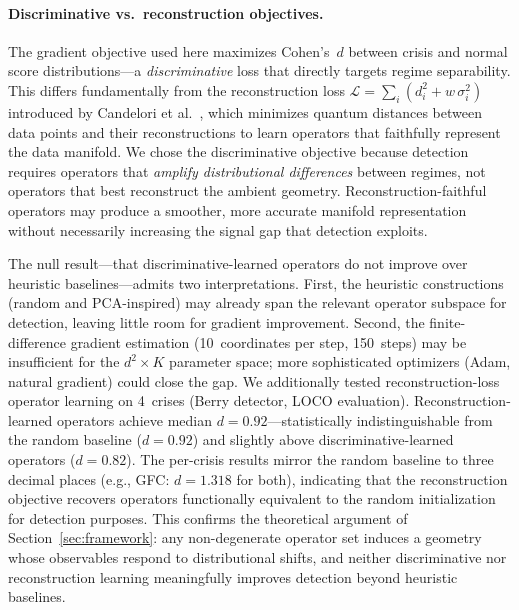 \documentclass[3p]{elsarticle}
\begin{document}
\paragraph{Discriminative vs.\ reconstruction objectives.}
The gradient objective used here maximizes Cohen's~$d$ between
crisis and normal score distributions---a \emph{discriminative}
loss that directly targets regime separability.  This differs
fundamentally from the reconstruction loss
$\mathcal{L} = \sum_i (d_i^2 + w\,\sigma_i^2)$ introduced
by Candelori et al.~\cite{candelori2025}, which minimizes
quantum distances between data points and their reconstructions
to learn operators that faithfully represent the data manifold.
We chose the discriminative objective because detection requires
operators that \emph{amplify distributional differences} between
regimes, not operators that best reconstruct the ambient geometry.
Reconstruction-faithful operators may produce a smoother, more
accurate manifold representation without necessarily increasing
the signal gap that detection exploits.

The null result---that discriminative-learned operators do not
improve over heuristic baselines---admits two interpretations.
First, the heuristic constructions (random and PCA-inspired)
may already span the relevant operator subspace for detection,
leaving little room for gradient improvement.
Second, the finite-difference gradient estimation (10~coordinates
per step, 150~steps) may be insufficient for the $d^2 \times K$
parameter space; more sophisticated optimizers (Adam, natural
gradient) could close the gap.
We additionally tested reconstruction-loss operator
learning on 4~crises (Berry detector, LOCO evaluation).
Reconstruction-learned operators achieve median
$d = 0.92$---statistically indistinguishable from the
random baseline ($d = 0.92$) and slightly above discriminative-learned
operators ($d = 0.82$).  The per-crisis results mirror the random
baseline to three decimal places (e.g., GFC: $d = 1.318$ for both),
indicating that the reconstruction objective recovers operators
functionally equivalent to the random initialization for detection
purposes.  This confirms the theoretical argument of
Section~\ref{sec:framework}: any non-degenerate operator set induces
a geometry whose observables respond to distributional shifts,
and neither discriminative nor reconstruction learning meaningfully
improves detection beyond heuristic baselines.

\end{document}
